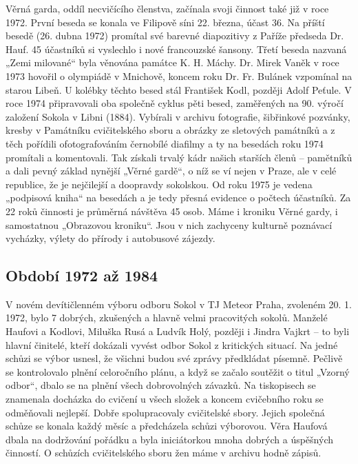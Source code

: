 Věrná garda, oddíl necvičícího členstva, začínala svoji činnost také již
v roce 1972. První beseda se konala ve Filipově síni 22. března, účast
36. Na příští besedě (26. dubna 1972) promítal své barevné diapozitivy z
Paříže předseda Dr. Hauf. 45 účastníků si vyslechlo i nové francouzské
šansony. Třetí beseda nazvaná „Zemi milované`` byla věnována památce K.
H. Máchy. Dr. Mirek Vaněk v roce 1973 hovořil o olympiádě v Mnichově,
koncem roku Dr. Fr. Bulánek vzpomínal na starou Libeň. U kolébky těchto
besed stál František Kodl, později Adolf Peťule. V roce 1974
připravovali oba společně cyklus pěti besed, zaměřených na 90. výročí
založení Sokola v Libni (1884). Vybírali v archivu fotografie,
šibřinkové pozvánky, kresby v Památníku cvičitelského sboru a obrázky ze
sletových památníků a z těch pořídili ofotografováním černobílé diafilmy
a ty na besedách roku 1974 promítali a komentovali. Tak získali trvalý
kádr našich starších členů -- pamětníků a dali pevný základ nynější
„Věrné gardě``, o níž se ví nejen v Praze, ale v celé republice, že je
nejčilejší a doopravdy sokolskou. Od roku 1975 je vedena „podpisová
kniha`` na besedách a je tedy přesná evidence o počtech účastníků. Za 22
roků činnosti je průměrná návštěva 45 osob. Máme i kroniku Věrné gardy,
i samostatnou „Obrazovou kroniku``. Jsou v nich zachyceny kulturně
poznávací vycházky, výlety do přírody i autobusové zájezdy.

\subsection{Období 1972 až 1984}\label{obdobuxed-1972-aux17e-1984}

V novém devítičlenném výboru odboru Sokol v TJ Meteor Praha, zvoleném
20. 1. 1972, bylo 7 dobrých, zkušených a hlavně velmi pracovitých
sokolů. Manželé Haufovi a Kodlovi, Miluška Rusá a Ludvík Holý, později i
Jindra Vajkrt -- to byli hlavní činitelé, kteří dokázali vyvést odbor
Sokol z kritických situací. Na jedné schůzi se výbor usnesl, že všichni
budou své zprávy předkládat písemně. Pečlivě se kontrolovalo plnění
celoročního plánu, a když se začalo soutěžit o titul „Vzorný odbor``,
dbalo se na plnění všech dobrovolných závazků. Na tiskopisech se
znamenala docházka do cvičení u všech složek a koncem cvičebního roku se
odměňovali nejlepší. Dobře spolupracovaly cvičitelské sbory. Jejich
společná schůze se konala každý měsíc a předcházela schůzi výborovou.
Věra Haufová dbala na dodržování pořádku a byla iniciátorkou mnoha
dobrých a úspěšných činností. O schůzích cvičitelského sboru žen máme v
archivu hodně zápisů.

